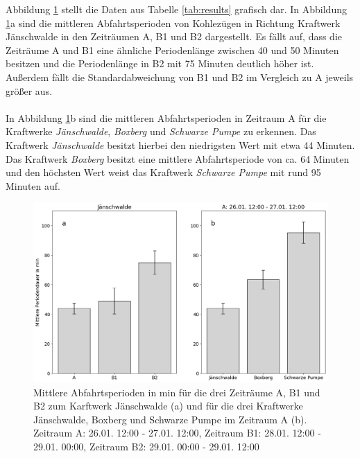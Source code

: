 Abbildung \ref{fig:results-periods} stellt die Daten aus Tabelle \ref{tab:results} grafisch dar. In Abbildung \ref{fig:results-periods}a sind die mittleren Abfahrtsperioden von Kohlezügen in Richtung Kraftwerk Jänschwalde in den Zeiträumen A, B1 und B2 dargestellt. Es fällt auf, dass die Zeiträume A und B1 eine ähnliche Periodenlänge zwischen 40 und 50 Minuten besitzen und die Periodenlänge in B2 mit 75 Minuten deutlich höher ist. Außerdem fällt die Standardabweichung von B1 und B2 im Vergleich zu A jeweils größer aus.\\
\\
In Abbildung \ref{fig:results-periods}b sind die mittleren Abfahrtsperioden in Zeitraum A für die Kraftwerke \emph{Jänschwalde}, \emph{Boxberg} und \emph{Schwarze Pumpe} zu erkennen. Das Kraftwerk \emph{Jänschwalde} besitzt hierbei den niedrigsten Wert mit etwa 44 Minuten. Das Kraftwerk \emph{Boxberg} besitzt eine mittlere Abfahrtsperiode von ca. 64 Minuten und den höchsten Wert weist das Kraftwerk \emph{Schwarze Pumpe} mit rund 95 Minuten auf.

\begin{figure}[H]
	\centering
	\includegraphics[width=1.0\linewidth]{images/results/periods.png}
	\caption{Mittlere Abfahrtsperioden in min für die drei Zeiträume A, B1 und B2 zum Karftwerk Jänschwalde (a) und für die drei Kraftwerke Jänschwalde, Boxberg und Schwarze Pumpe im Zeitraum A (b). Zeitraum A: 26.01. 12:00 - 27.01. 12:00, Zeitraum B1: 28.01. 12:00 - 29.01. 00:00, Zeitraum B2: 29.01. 00:00 - 29.01. 12:00}
	\label{fig:results-periods}
\end{figure}



